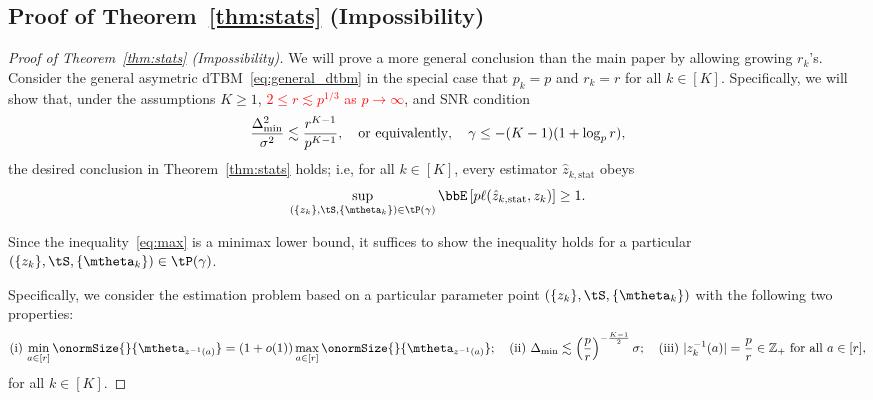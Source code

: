 \documentclass[lettersize,onecolumn,journal]{IEEEtran}
\theoremstyle{definition}
\theoremstyle{definition}
\def\fixme#1#2{\textbf{\color{red}[FIXME (#1): #2]}}
\begin{document}
\subsection{Proof of Theorem~\ref{thm:stats} (Impossibility)}\label{sec:statprove1}

\begin{proof}[Proof of Theorem~\ref{thm:stats} (Impossibility)]
We will prove a more general conclusion than the main paper by allowing growing $r_k$'s. 
Consider the general asymetric dTBM~\eqref{eq:general_dtbm} in the special case that $p_k = p$ and $r_k = r$ for all $ k\in [K]$. Specifically, we will show that, under 
the assumptions $K\geq 1$, \textcolor{red}{$2 \leq r\lesssim p^{1/3}$ as 
$p \rightarrow \infty$}, and SNR condition
\[
{\Delta^2_{\min}\over \sigma^2}\lesssim {r^{K-1}\over p^{K-1}},\quad \text{or equivalently}, \quad \gamma\leq -(K-1)(1+\log_p r),
\]
 the desired conclusion in Theorem~\ref{thm:stats} holds; i.e, for all $k \in [K]$, every estimator $\hat z_{k,\text{stat}}$ obeys
\begin{equation}\label{eq:max}
    \sup_{(\{z_k\}, \tS, \{\mtheta_k\}) \in \tP(\gamma)} \bbE \left[ p\ell(\hat z_{k,\text{stat}}, z_k) \right]\geq 1.
\end{equation}

Since the inequality~\eqref{eq:max} is a minimax lower bound, it suffices to show the inequality holds for a particular $(\{z_k\}, \tS, \{\mtheta_k\}) \in \tP(\gamma)$. 

{
\color{blue} 

Specifically, we consider the estimation problem based on a particular parameter point $(\{z_k\}, \tS, \{\mtheta_k\})$ with the following two properties:
\begin{equation}\label{eq:construction}
\text{(i)}\  {\min_{a\in[r]} \onormSize{}{\mtheta_{z^{-1}(a)}}=\left(1+o(1)\right)\max_{a\in[r]}\onormSize{}{\mtheta_{z^{-1}(a)}}}; \quad  \text{(ii)}\ 
    \Delta_{\min}\lesssim  \left({p\over r}\right)^{-\frac{K-1}{2}}\sigma; \quad  \text{(iii)}\ |z^{-1}_k(a)|={p \over r} \in \mathbb{Z}_+ \text{ for all }a\in[r],
\end{equation}
for all $k \in [K]$.

}
\end{proof}
\end{document}
